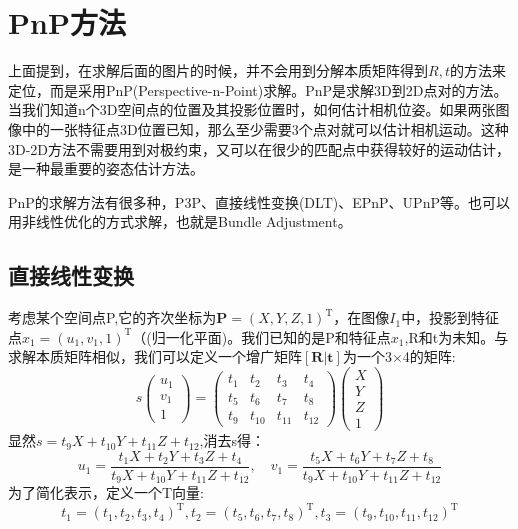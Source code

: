 \section{PnP方法}
上面提到，在求解后面的图片的时候，并不会用到分解本质矩阵得到$R,t$的方法来定位，而是采用PnP(Perspective-n-Point)求解。PnP是求解3D到2D点对的方法。当我们知道n个3D空间点的位置及其投影位置时，如何估计相机位姿。如果两张图像中的一张特征点3D位置已知，那么至少需要3个点对就可以估计相机运动。这种3D-2D方法不需要用到对极约束，又可以在很少的匹配点中获得较好的运动估计，是一种最重要的姿态估计方法。\par
PnP的求解方法有很多种，P3P\cite{gao2003complete}、直接线性变换(DLT)、EPnP\cite{lepetit2009epnp}、UPnP\cite{penate2013exhaustive}等。也可以用非线性优化的方式求解，也就是Bundle Adjustment。
\subsection{直接线性变换}
考虑某个空间点P,它的齐次坐标为$\boldsymbol{P}=(X, Y, Z, 1)^{\mathrm{T}}$，在图像$I_1$中，投影到特征点$x_{1}=\left(u_{1}, v_{1}, 1\right)^{\mathrm{T}}$（(归一化平面)。我们已知的是P和特征点$x_1$,R和t为未知。与求解本质矩阵相似，我们可以定义一个增广矩阵$\left[\boldsymbol{R} | \boldsymbol{t}\right]$为一个3$\times$4的矩阵:
\begin{equation}
s \left( \begin{array}{c}{u_{1}} \\ {v_{1}} \\ {1}\end{array}\right)=\left( \begin{array}{cccc}{t_{1}} & {t_{2}} & {t_{3}} & {t_{4}} \\ {t_{5}} & {t_{6}} & {t_{7}} & {t_{8}} \\ {t_{9}} & {t_{10}} & {t_{11}} & {t_{12}}\end{array}\right) \left( \begin{array}{l}{X} \\ {Y} \\ {Z} \\ {1}\end{array}\right)
\end{equation}
显然$s=t_{9} X+t_{10} Y+t_{11} Z+t_{12}$,消去s得：
\begin{equation}
u_{1}=\frac{t_{1} X+t_{2} Y+t_{3} Z+t_{4}}{t_{9} X+t_{10} Y+t_{11} Z+t_{12}}, \quad v_{1}=\frac{t_{5} X+t_{6} Y+t_{7} Z+t_{8}}{t_{9} X+t_{10} Y+t_{11} Z+t_{12}}
\end{equation}
为了简化表示，定义一个T向量:
\begin{equation}
t_{1}=\left(t_{1}, t_{2}, t_{3}, t_{4}\right)^{\mathrm{T}}, t_{2}=\left(t_{5}, t_{6}, t_{7}, t_{8}\right)^{\mathrm{T}}, t_{3}=\left(t_{9}, t_{10}, t_{11}, t_{12}\right)^{\mathrm{T}}
\end{equation}
